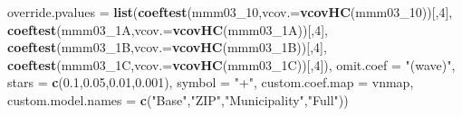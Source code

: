 \documentclass[
]{article}
\newenvironment{Shaded}{\begin{snugshade}}{\end{snugshade}}
\newcommand{\DataTypeTok}[1]{\textcolor[rgb]{0.13,0.29,0.53}{#1}}
\newcommand{\DecValTok}[1]{\textcolor[rgb]{0.00,0.00,0.81}{#1}}
\newcommand{\FloatTok}[1]{\textcolor[rgb]{0.00,0.00,0.81}{#1}}
\newcommand{\KeywordTok}[1]{\textcolor[rgb]{0.13,0.29,0.53}{\textbf{#1}}}
\newcommand{\NormalTok}[1]{#1}
\newcommand{\StringTok}[1]{\textcolor[rgb]{0.31,0.60,0.02}{#1}}
\begin{document}
\begin{Shaded}
\begin{Highlighting}[]
          \DataTypeTok{override.pvalues =} \KeywordTok{list}\NormalTok{(}\KeywordTok{coeftest}\NormalTok{(mmm03_}\DecValTok{10}\NormalTok{,}\DataTypeTok{vcov.=}\KeywordTok{vcovHC}\NormalTok{(mmm03_}\DecValTok{10}\NormalTok{))[,}\DecValTok{4}\NormalTok{],}
                                  \KeywordTok{coeftest}\NormalTok{(mmm03_1A,}\DataTypeTok{vcov.=}\KeywordTok{vcovHC}\NormalTok{(mmm03_1A))[,}\DecValTok{4}\NormalTok{],}
                                  \KeywordTok{coeftest}\NormalTok{(mmm03_1B,}\DataTypeTok{vcov.=}\KeywordTok{vcovHC}\NormalTok{(mmm03_1B))[,}\DecValTok{4}\NormalTok{],}
                                  \KeywordTok{coeftest}\NormalTok{(mmm03_1C,}\DataTypeTok{vcov.=}\KeywordTok{vcovHC}\NormalTok{(mmm03_1C))[,}\DecValTok{4}\NormalTok{]),}
          \DataTypeTok{omit.coef =} \StringTok{"(wave)"}\NormalTok{, }\DataTypeTok{stars =} \KeywordTok{c}\NormalTok{(}\FloatTok{0.1}\NormalTok{,}\FloatTok{0.05}\NormalTok{,}\FloatTok{0.01}\NormalTok{,}\FloatTok{0.001}\NormalTok{), }\DataTypeTok{symbol =} \StringTok{"+"}\NormalTok{,}
          \DataTypeTok{custom.coef.map =}\NormalTok{ vnmap, }
          \DataTypeTok{custom.model.names =} \KeywordTok{c}\NormalTok{(}\StringTok{"Base"}\NormalTok{,}\StringTok{"ZIP"}\NormalTok{,}\StringTok{"Municipality"}\NormalTok{,}\StringTok{"Full"}\NormalTok{))}
\end{Highlighting}
\end{Shaded}
\end{document}
